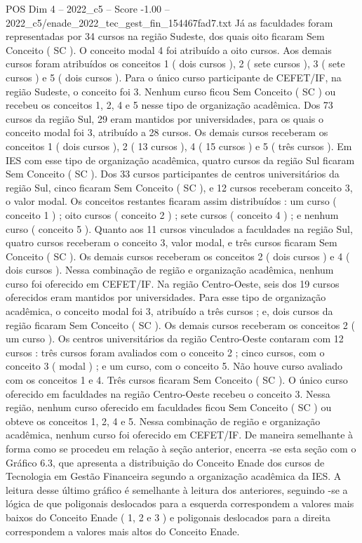 \begin{textsample}{POS Dim 4 – 2022\_c5 – Score -1.00 – 2022\_c5/enade\_2022\_tec\_gest\_fin\_154467fad7.txt}
Já as faculdades foram representadas por 34 cursos na região Sudeste, dos quais oito ficaram Sem Conceito ( SC ).
O conceito modal 4 foi atribuído a oito cursos.
Aos demais cursos foram atribuídos os conceitos 1 ( dois cursos ), 2 ( sete cursos ), 3 ( sete cursos ) e 5 ( dois cursos ).
Para o único curso participante de CEFET/IF, na região Sudeste, o conceito foi 3.
Nenhum curso ficou Sem Conceito ( SC ) ou recebeu os conceitos 1, 2, 4 e 5 nesse tipo de organização acadêmica.
Dos 73 cursos da região Sul, 29 eram mantidos por universidades, para os quais o conceito modal foi 3, atribuído a 28 cursos.
Os demais cursos receberam os conceitos 1 ( dois cursos ), 2 ( 13 cursos ), 4 ( 15 cursos ) e 5 ( três cursos ).
Em IES com esse tipo de organização acadêmica, quatro cursos da região Sul ficaram Sem Conceito ( SC ).
Dos 33 cursos participantes de centros universitários da região Sul, cinco ficaram Sem Conceito ( SC ), e 12 cursos receberam conceito 3, o valor modal.
Os conceitos restantes ficaram assim distribuídos : um curso ( conceito 1 ) ; oito cursos ( conceito 2 ) ; sete cursos ( conceito 4 ) ; e nenhum curso ( conceito 5 ).
Quanto aos 11 cursos vinculados a faculdades na região Sul, quatro cursos receberam o conceito 3, valor modal, e três cursos ficaram Sem Conceito ( SC ).
Os demais cursos receberam os conceitos 2 ( dois cursos ) e 4 ( dois cursos ).
Nessa combinação de região e organização acadêmica, nenhum curso foi oferecido em CEFET/IF.
Na região Centro-Oeste, seis dos 19 cursos oferecidos eram mantidos por universidades.
Para esse tipo de organização acadêmica, o conceito modal foi 3, atribuído a três cursos ; e, dois cursos da região ficaram Sem Conceito ( SC ).
Os demais cursos receberam os conceitos 2 ( um curso ).
Os centros universitários da região Centro-Oeste contaram com 12 cursos : três cursos foram avaliados com o conceito 2 ; cinco cursos, com o conceito 3 ( modal ) ; e um curso, com o conceito 5.
Não houve curso avaliado com os conceitos 1 e 4.
Três cursos ficaram Sem Conceito ( SC ).
O único curso oferecido em faculdades na região Centro-Oeste recebeu o conceito 3.
Nessa região, nenhum curso oferecido em faculdades ficou Sem Conceito ( SC ) ou obteve os conceitos 1, 2, 4 e 5.
Nessa combinação de região e organização acadêmica, nenhum curso foi oferecido em CEFET/IF.
De maneira semelhante à forma como se procedeu em relação à seção anterior, encerra -se esta seção com o Gráfico 6.3, que apresenta a distribuição do Conceito Enade dos cursos de Tecnologia em Gestão Financeira segundo a organização acadêmica da IES.
A leitura desse último gráfico é semelhante à leitura dos anteriores, seguindo -se a lógica de que poligonais deslocados para a esquerda correspondem a valores mais baixos do Conceito Enade ( 1, 2 e 3 ) e poligonais deslocados para a direita correspondem a valores mais altos do Conceito Enade.

\end{textsample}
